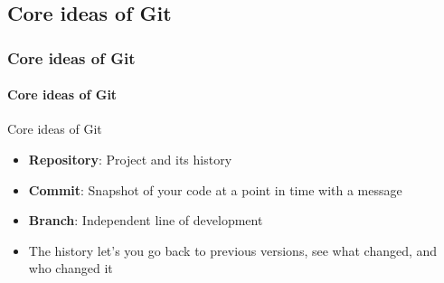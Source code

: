\documentclass[aspectratio=169,dvipsnames]{beamer}
\begin{document}
\subsection{Core ideas of Git}
\begin{frame}
    \frametitle{Core ideas of Git}
    \framesubtitle{Core ideas of Git}
    \begin{block}{Core ideas of Git}
        \begin{itemize}
            \item \textbf{Repository}: Project and its history
            \item \textbf{Commit}: Snapshot of your code at a point in time with a message
            \item \textbf{Branch}: Independent line of development
            \item The history let's you go back to previous versions, see what changed, and who changed it
        \end{itemize}
    \end{block}
\end{frame}
\end{document}

